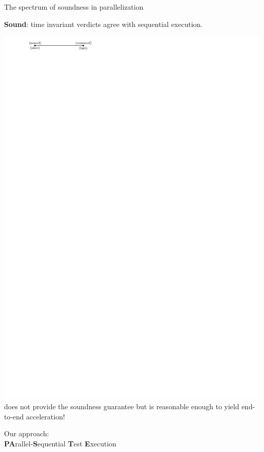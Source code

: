 \documentclass{beamer}
\begin{document}
\begin{frame}{The spectrum of soundness in parallelization}
	
{\textbf{\rsm Sound}: time invariant verdicts agree with sequential execution.}
	\begin{center}
		\includegraphics[width=0.8\linewidth,page=2]{images/spectrum.pdf}
		\vfill
		{\color{blue}\tname{} does not provide the soundness guarantee but is reasonable enough to yield end-to-end acceleration!}
	\end{center}
\end{frame}

\begingroup
\renewcommand{\disp}{}
\begin{frame}
	\begin{center}
		Our approach: \textbf{\tname}\\
		{\textbf{\rsm PA}rallel-\textbf{\rsm S}equential \textbf{\rsm T}est \textbf{\rsm E}xecution}
	\end{center}
\end{frame}
\endgroup
\addtocounter{framenumber}{-1}
\end{document}
